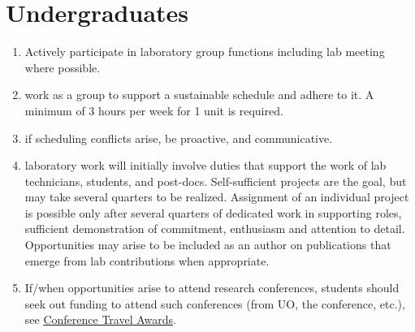 \documentclass[12pt]{article}
\begin{document}
\section{Undergraduates}
\begin{enumerate}
\item Actively participate in laboratory group functions including lab
  meeting where possible.
\item work as a group to support a sustainable schedule and adhere to
  it. A minimum of 3 hours per week for 1 unit is required. 
\item if scheduling conflicts arise, be proactive, and communicative.
\item laboratory work will initially involve duties that support the
  work of lab technicians, students, and post-docs. Self-sufficient
  projects are the goal, but may take several quarters to be
  realized. Assignment of an individual project is possible only after
  several quarters of dedicated work in supporting roles, sufficient
  demonstration of commitment, enthusiasm and attention to
  detail. Opportunities may arise to be included as an author on
  publications that emerge from lab contributions when appropriate.
\item If/when opportunities arise to attend research conferences,
  students should seek out funding to attend such conferences (from
  UO, the conference, etc.), see
  \href{https://urds.uoregon.edu/cure-awards/conference}{Conference
    Travel Awards}.
\end{enumerate}
\end{document}
